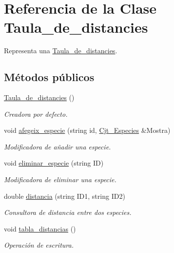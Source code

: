 \hypertarget{class_taula__de__distancies}{}\section{Referencia de la Clase Taula\+\_\+de\+\_\+distancies}
\label{class_taula__de__distancies}


Representa una \hyperlink{class_taula__de__distancies}{Taula\+\_\+de\+\_\+distancies}.  


\subsection*{Métodos públicos}
\begin{DoxyCompactItemize}
\item 
\hyperlink{class_taula__de__distancies_a1524c765545a07965c2498d7d7be0c0d}{Taula\+\_\+de\+\_\+distancies} ()
\begin{DoxyCompactList}\small\item\em Creadora por defecto. \end{DoxyCompactList}\item 
void \hyperlink{class_taula__de__distancies_a6202c78b8a7c330d1be356d86e644a89}{afegeix\+\_\+especie} (string id, \hyperlink{class_cjt___especies}{Cjt\+\_\+\+Especies} \&Mostra)
\begin{DoxyCompactList}\small\item\em Modificadora de añadir una especie. \end{DoxyCompactList}\item 
void \hyperlink{class_taula__de__distancies_ab7b1113061a5022c4444ff299e143f50}{eliminar\+\_\+especie} (string ID)
\begin{DoxyCompactList}\small\item\em Modificadora de eliminar una especie. \end{DoxyCompactList}\item 
double \hyperlink{class_taula__de__distancies_af3dfa32f4b29765b4ad1968bbb17ee16}{distancia} (string I\+D1, string I\+D2)
\begin{DoxyCompactList}\small\item\em Consultora de distancia entre dos especies. \end{DoxyCompactList}\item 
void \hyperlink{class_taula__de__distancies_a494108f6c1af52fd9f8032d1ec78fc32}{tabla\+\_\+distancias} ()
\begin{DoxyCompactList}\small\item\em Operación de escritura. \end{DoxyCompactList}\item 

\end{DoxyCompactItemize}
